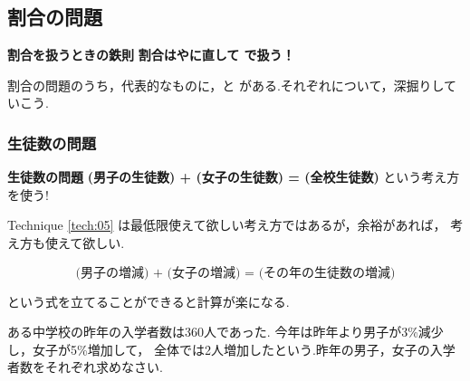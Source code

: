 \subsection{割合の問題}

    \begin{techniquebox}[tech:04]{\textbf{割合を扱うときの鉄則}}
        \textbf{割合は\fitblankbf[分数]{}や\fitblankbf[小数]{}に直して
        \fitblankbf[かけ算]{}で扱う！}
    \end{techniquebox}

    割合の問題のうち，代表的なものに，と
    がある.それぞれについて，深掘りしていこう.

    \subsubsection{生徒数の問題}
    \vspace{1em}

        \begin{techniquebox}[tech:05]{\textbf{生徒数の問題}}
            \textbf{(男子の生徒数) + (女子の生徒数) = (全校生徒数)} という考え方を使う!
        \end{techniquebox}

        Technique \ref{tech:05} は最低限使えて欲しい考え方ではあるが，余裕があれば，
        考え方も使えて欲しい.

        \[\textbf{(男子の増減) + (女子の増減) = (その年の生徒数の増減)}\]

        \vspace{1.5em}
        という式を立てることができると計算が楽になる.

        \begin{example}[【例題 3】]
            ある中学校の昨年の入学者数は360人であった.
            今年は昨年より男子が3\%減少し，女子が5\%増加して，
            全体では2人増加したという.昨年の男子，女子の入学者数をそれぞれ求めなさい.
        \end{example}

